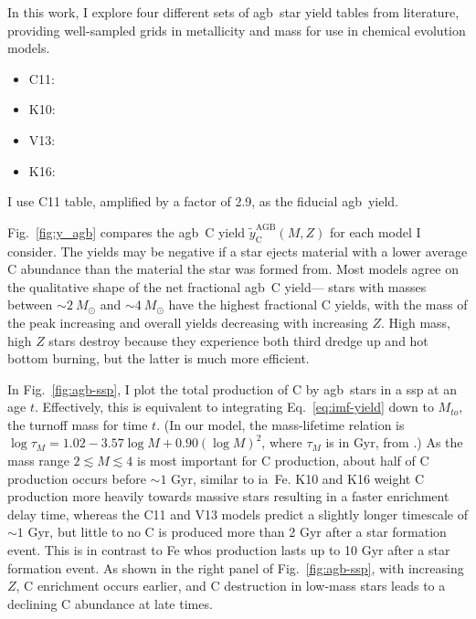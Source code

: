 \documentclass[12pt,oneside,letterpaper]{report}
\newcommand{\agb}{\gls{agb}}
\newcommand{\ia}{\gls{ia}}
\newcommand{\ssp}{\gls{ssp}}
\newcommand{\about}[1]{${\sim} #1$}
\begin{document}
In this work, I explore four different sets of \agb\ star yield tables from literature, providing well-sampled grids in metallicity and mass for use in chemical evolution models. 
\begin{itemize}
    \item C11: \citet{cristallo+11, cristallo+15}
    \item K10: \citet{karakas10}
    \item V13: \citet{ventura+13,ventura+14,ventura+18, ventura+20}
    \item K16: \citet{KL16} \citet{karakas+18}
\end{itemize}
I use C11 table, amplified by a factor of 2.9, as the fiducial \agb\ yield.

Fig.~\ref{fig:y_agb} compares the \agb\ C yield $\tilde{y}_\text{C}^\text{AGB}(M, Z)$ for each model I consider. 
The yields may be negative if a star ejects material with a lower average C abundance than the material the star was formed from.
Most models agree on the qualitative shape of the net fractional \agb\ C yield---%
stars with masses between \about{2~M_\odot} and \about{4~M_\odot} have the highest fractional C yields, with the mass of the peak increasing and overall yields decreasing with increasing $Z$.  High mass, high $Z$ stars destroy  because they experience both third dredge up and hot bottom burning, but the latter is much more efficient.

In Fig.~\ref{fig:agb-ssp}, I plot the total production of C by \agb\ stars in a \ssp{} at an age $t$. 
Effectively, this is equivalent to integrating Eq.~\ref{eq:imf-yield} down to $M_{to}$, the turnoff mass for time $t$.
({In our model, the mass-lifetime relation is
$\log \tau_M = 1.02 - 3.57\log M + 0.90 \left(\log M\right)^2$,
where $\tau_M$ is in Gyr,
from \citealt{larson74}.})
As the mass range $2\lesssim M \lesssim 4$ is most important for C production, about half of C production occurs before \about{1} Gyr, similar to \ia\ Fe. 
K10 and K16 weight C production more heavily towards massive stars resulting in a faster enrichment delay time, whereas the C11 and V13 models predict a slightly longer timescale of \about{1} Gyr, but little to no C is produced more than 2 Gyr after a star formation event. This is in contrast to Fe whos production lasts up to 10 Gyr after a star formation event. As shown in the right panel of Fig.~\ref{fig:agb-ssp}, with increasing $Z$, C enrichment occurs earlier, and C destruction in low-mass stars leads to a declining C abundance at late times.
    
\end{document}
